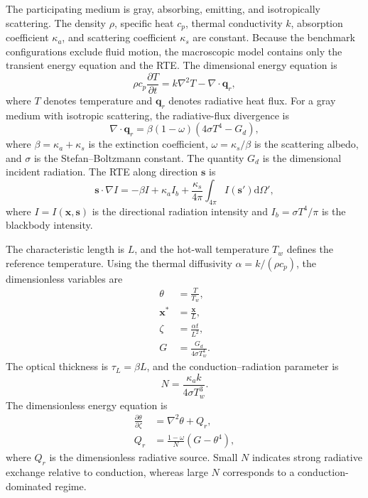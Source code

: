 \documentclass[a4paper,12pt]{ctexart}
\numberwithin{equation}{section}
\newcommand{\vb}[1]{\bm{#1}}
\newcommand{\vx}{\vb{x}}
\newcommand{\vs}{\vb{s}}
\newcommand{\vq}{\vb{q}}
\newcommand{\dd}{\mathrm{d}}
\begin{document}
The participating medium is gray, absorbing, emitting, and isotropically scattering. The density $\rho$, specific heat $c_p$, thermal conductivity $k$, absorption coefficient $\kappa_a$, and scattering coefficient $\kappa_s$ are constant. Because the benchmark configurations exclude fluid motion, the macroscopic model contains only the transient energy equation and the RTE. The dimensional energy equation is
\begin{equation*}
\rho c_p\frac{\partial T}{\partial t}=k\nabla^2T-\nabla\cdot\vq_r,
\end{equation*}
where $T$ denotes temperature and $\vq_r$ denotes radiative heat flux. For a gray medium with isotropic scattering, the radiative-flux divergence is
\begin{equation*}
\nabla\cdot\vq_r=\beta(1-\omega)\left(4\sigma T^4-G_d\right),
\end{equation*}
where $\beta=\kappa_a+\kappa_s$ is the extinction coefficient, $\omega=\kappa_s/\beta$ is the scattering albedo, and $\sigma$ is the Stefan--Boltzmann constant. The quantity $G_d$ is the dimensional incident radiation. The RTE along direction $\vs$ is
\begin{equation*}
\vs\cdot\nabla I=-\beta I+\kappa_a I_b+\frac{\kappa_s}{4\pi}\int_{4\pi}I(\vs')\dd\Omega',
\end{equation*}
where $I=I(\vx,\vs)$ is the directional radiation intensity and $I_b=\sigma T^4/\pi$ is the blackbody intensity.

The characteristic length is $L$, and the hot-wall temperature $T_w$ defines the reference temperature. Using the thermal diffusivity $\alpha=k/(\rho c_p)$, the dimensionless variables are
\begin{equation*}
\begin{aligned}
\theta&=\frac{T}{T_w},\\
\vx^*&=\frac{\vx}{L},\\
\zeta&=\frac{\alpha t}{L^2},\\
G&=\frac{G_d}{4\sigma T_w^4}.
\end{aligned}
\end{equation*}
The optical thickness is $\tau_L=\beta L$, and the conduction--radiation parameter is
\begin{equation*}
N=\frac{\kappa_a k}{4\sigma T_w^3}.
\end{equation*}
The dimensionless energy equation is
\begin{equation}
\begin{aligned}
\frac{\partial\theta}{\partial\zeta}&=\nabla^2\theta+Q_r,
\\
Q_r&=\frac{1-\omega}{N}\left(G-\theta^4\right),
\end{aligned}
\label{eq:dimensionless_energy}
\end{equation}
where $Q_r$ is the dimensionless radiative source. Small $N$ indicates strong radiative exchange relative to conduction, whereas large $N$ corresponds to a conduction-dominated regime.
\end{document}
